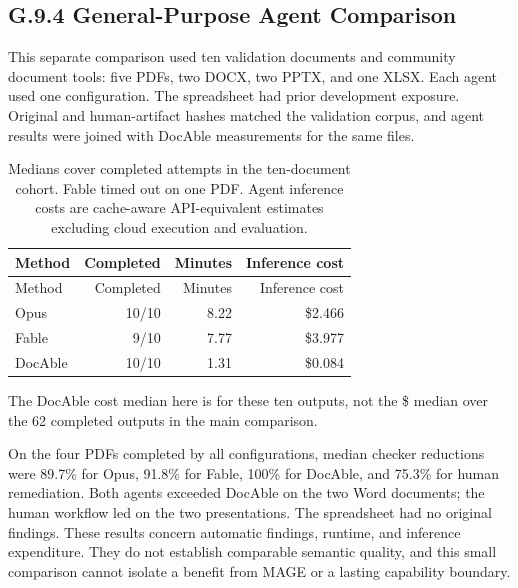 \subsection{G.9.4 General-Purpose Agent Comparison}\label{heading:docable-agent-comparison-receipt}

This separate comparison used ten validation documents and community document tools: five PDFs, two DOCX, two PPTX, and one XLSX. Each agent used one configuration. The spreadsheet had prior development exposure. Original and human-artifact hashes matched the validation corpus, and agent results were joined with DocAble measurements for the same files.

{\footnotesize
\begin{longtable}[]{@{}lrrr@{}}
\caption[Agent and service remediation comparison]{Medians cover completed attempts in the ten-document cohort. Fable timed out on one PDF. Agent inference costs are cache-aware API-equivalent estimates excluding cloud execution and evaluation.}\label{agent-remediation-comparison}\tabularnewline
\toprule\noalign{}
Method & Completed & Minutes & Inference cost \\
\midrule\noalign{}
\endfirsthead
\toprule\noalign{}
Method & Completed & Minutes & Inference cost \\
\midrule\noalign{}
\endhead
\bottomrule\noalign{}
\endlastfoot

Opus & 10/10 & 8.22 & \$2.466 \\
Fable & 9/10 & 7.77 & \$3.977 \\
DocAble & 10/10 & 1.31 & \$0.084 \\
\end{longtable}
}

The DocAble cost median here is for these ten outputs, not the \$ median over the 62 completed outputs in the main comparison.

On the four PDFs completed by all configurations, median checker reductions were 89.7\% for Opus, 91.8\% for Fable, 100\% for DocAble, and 75.3\% for human remediation. Both agents exceeded DocAble on the two Word documents; the human workflow led on the two presentations. The spreadsheet had no original findings. These results concern automatic findings, runtime, and inference expenditure. They do not establish comparable semantic quality, and this small comparison cannot isolate a benefit from MAGE or a lasting capability boundary.
